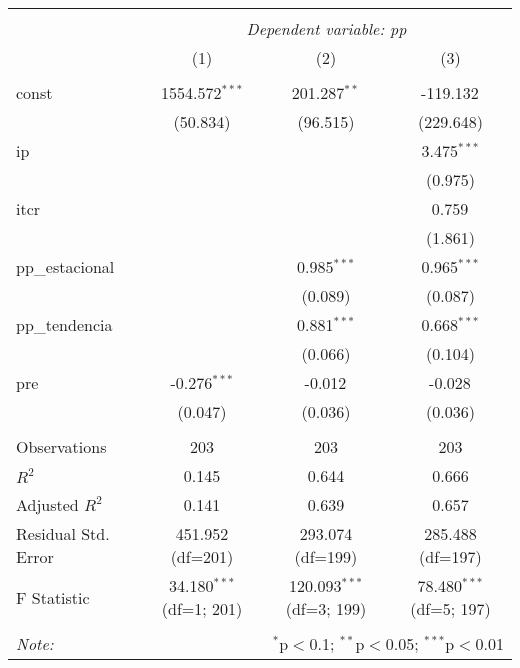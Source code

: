 \begin{table}[!htbp] \centering
\begin{tabular}{@{\extracolsep{5pt}}lccc}
\\[-1.8ex]\hline
\hline \\[-1.8ex]
& \multicolumn{3}{c}{\textit{Dependent variable: pp}} \
\cr \cline{2-4}
\\[-1.8ex] & (1) & (2) & (3) \\
\hline \\[-1.8ex]
 const & 1554.572$^{***}$ & 201.287$^{**}$ & -119.132$^{}$ \\
& (50.834) & (96.515) & (229.648) \\
 ip & & & 3.475$^{***}$ \\
& & & (0.975) \\
 itcr & & & 0.759$^{}$ \\
& & & (1.861) \\
 pp_estacional & & 0.985$^{***}$ & 0.965$^{***}$ \\
& & (0.089) & (0.087) \\
 pp_tendencia & & 0.881$^{***}$ & 0.668$^{***}$ \\
& & (0.066) & (0.104) \\
 pre & -0.276$^{***}$ & -0.012$^{}$ & -0.028$^{}$ \\
& (0.047) & (0.036) & (0.036) \\
\hline \\[-1.8ex]
 Observations & 203 & 203 & 203 \\
 $R^2$ & 0.145 & 0.644 & 0.666 \\
 Adjusted $R^2$ & 0.141 & 0.639 & 0.657 \\
 Residual Std. Error & 451.952 (df=201) & 293.074 (df=199) & 285.488 (df=197) \\
 F Statistic & 34.180$^{***}$ (df=1; 201) & 120.093$^{***}$ (df=3; 199) & 78.480$^{***}$ (df=5; 197) \\
\hline
\hline \\[-1.8ex]
\textit{Note:} & \multicolumn{3}{r}{$^{*}$p$<$0.1; $^{**}$p$<$0.05; $^{***}$p$<$0.01} \\
\end{tabular}
\end{table}